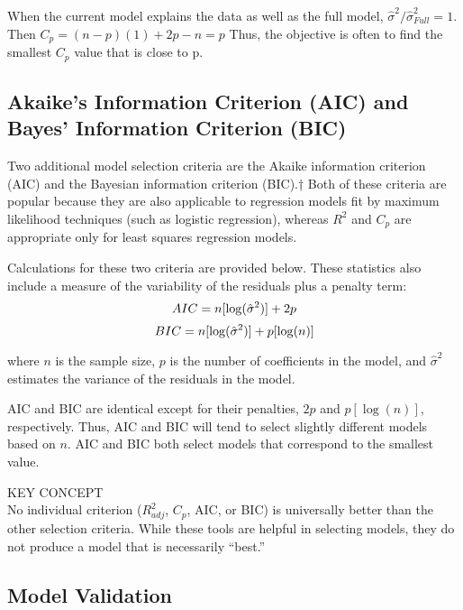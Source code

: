 \documentclass[
]{report}
\theoremstyle{definition}
\theoremstyle{definition}
\theoremstyle{definition}
\theoremstyle{definition}
\theoremstyle{remark}
\begin{document}
When the current model explains the data as well as the full model, \(\hat{\sigma}^2 / \hat{\sigma}^2_{Full} = 1\). Then \(C_p = (n - p)(1) + 2p - n = p\) Thus, the objective is often to find the smallest \(C_p\) value that is close to p.

\hypertarget{akaikes-information-criterion-aic-and-bayes-information-criterion-bic}{%
\subsection{Akaike's Information Criterion (AIC) and Bayes' Information Criterion (BIC)}\label{akaikes-information-criterion-aic-and-bayes-information-criterion-bic}}

Two additional model selection criteria are the Akaike information criterion (AIC) and the Bayesian information criterion (BIC).† Both of these criteria are popular because they are also applicable to regression models fit by maximum likelihood techniques (such as logistic regression), whereas \(R^2\) and \(C_p\) are appropriate only for least squares regression models.

Calculations for these two criteria are provided below. These statistics also include a measure of the variability of the residuals plus a penalty term:
\begin{equation}
AIC = n[\log(\hat{\sigma}^2)] + 2p \notag
\end{equation}
\begin{equation}
BIC = n[\log(\hat{\sigma}^2)] + p[\log(n)] \notag
\end{equation}

where \(n\) is the sample size, \(p\) is the number of coefficients in the model, and \(\hat{\sigma}^2\) estimates the variance of the residuals in the model.

AIC and BIC are identical except for their penalties, \(2p\) and \(p[\log(n)]\), respectively. Thus, AIC and BIC will tend to select slightly different models based on \(n\). AIC and BIC both select models that correspond to the smallest value.

KEY CONCEPT\\
No individual criterion (\(R^2_{adj}\), \(C_p\), AIC, or BIC) is universally better than the other selection criteria. While these tools are helpful in selecting models, they do not produce a model that is necessarily ``best.''

\hypertarget{model-validation}{%
\subsection{Model Validation}\label{model-validation}}
\end{document}
